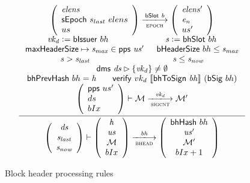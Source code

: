 \documentclass[11pt,a4paper]{article}
\newcommand{\restrictrange}{\rhd}
\newcommand{\var}[1]{\mathit{#1}}
\newcommand{\fun}[1]{\mathsf{#1}}
\newcommand{\trans}[2]{\xlongrightarrow[\textsc{#1}]{#2}}
\newcommand{\serialised}[1]{\llbracket \var{#1} \rrbracket}
\newcommand{\leteq}{\ensuremath{\mathrel{\mathop:}=}}
\newcommand{\bhdrsizename}{bHeaderSize}
\newcommand{\verifyname}{verify}
\newcommand{\signmapname}{\mathcal{M}}
\newcommand{\bsigname}{bSig}
\newcommand{\bissuername}{bIssuer}
\newcommand{\verify}[3]{\fun{\verifyname} ~ #1 ~ #2 ~ #3}
\newcommand{\bhdrsize}[1]{\fun{\bhdrsizename} ~ #1}
\newcommand{\bsig}[1]{\fun{\bsigname} ~ #1}
\newcommand{\bissuer}[1]{\fun{\bissuername} ~ #1}
\begin{document}
\begin{figure}[ht]
  \begin{equation*}
    \inference
    { {\left(
          \begin{array}{l}
            \var{elens} \\
            \sepoch{s_{last}}{elens} \\
            us
          \end{array}
        \right)}
      \trans{epoch}{\bslot{b}}
      {\left(
          \begin{array}{l}
            \var{elens'} \\
            \var{e_n} \\
            us'
          \end{array}
        \right)}
      \\
      \var{vk_d} \leteq \bissuer{bh} & \var{s} \leteq \bhslot{bh}
      \\ \maxheadersize \mapsto \var{s_{max}} \in \fun{pps}~\var{us'} & \bhdrsize{bh} \leq \var{s_{max}}
      \\ \var{s} > \var{s_{last}} & \var{s} \leq \var{s_{now}}
      \\ \fun{dms} ~  \var{ds} \restrictrange \{\var{vk_d}\} \neq \emptyset
      \\ \bhprevhash{bh} = \var{h} & \verify{vk_d}{\serialised{\bhtosign{bh}}}{(\bsig{bh})}
      \\
      {\left(
          \begin{array}{l}
            \fun{pps} ~  us' \\
            ds \\
            bIx
          \end{array}
        \right)}
      \vdash
      \signmapname \trans{sigcnt}{\var{vk_d}} \signmapname'
      \\
    }
    {
      \left(
        {\begin{array}{c}
           \var{ds} \\
           \var{s_{last}} \\
           \var{s_{now}} \\
         \end{array}}
     \right)
     \vdash
     \left(
       {\begin{array}{c}
          \var{h} \\
          \var{us} \\
          \signmapname \\
          bIx \\
        \end{array}}
    \right)
    \trans{bhead}{\var{bh}}
    \left(
      {\begin{array}{c}
         \bhhash{bh} \\
         \var{us'} \\
         \signmapname' \\
         bIx + 1 \\
       \end{array}}
   \right)
 }
\end{equation*}
\caption{Block header processing rules}
\label{fig:rules:bhead}
\end{figure}
\end{document}
